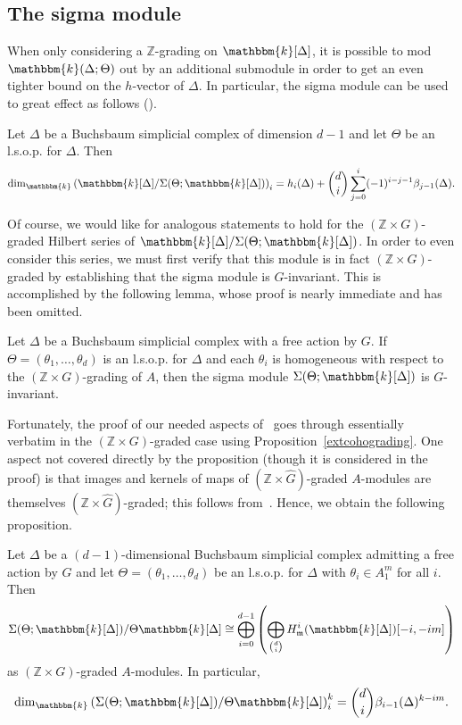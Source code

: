 \documentclass[ALCO,ThmDefs,Unicode]{cedram}
\newcommand{\field}{\mathbbm{k}}
\newcommand{\ZZ}{{\mathbb Z}}
\newcommand{\mideal}{\ensuremath{\mathfrak{m}}}
\begin{document}
\subsection{The sigma module}

When only considering a $\ZZ$-grading on $\field[\Delta]$, it is possible to mod $\field(\Delta; \Theta)$ out by an additional submodule in order to get an even tighter bound on the $h$-vector of $\Delta$. In particular, the sigma module can be used to great effect as follows (\cite[Theorem~1.2]{BBMD}).

\begin{theo}\label{BBMD}
Let $\Delta$ be a Buchsbaum simplicial complex of dimension $d-1$ and let $\Theta$ be an l.s.o.p. for $\Delta$. Then
\[
\dim_\field \left(\field[\Delta]/\Sigma(\Theta; \field[\Delta])\right)_i = h_i(\Delta)+\binom{d}{i}\sum_{j=0}^i(-1)^{i-j-1}\beta_{j-1}(\Delta).
\]
\end{theo}

Of course, we would like for analogous statements to hold for the $(\ZZ\times G)$-graded Hilbert series of $\field[\Delta]/\Sigma(\Theta; \field[\Delta])$. In order to even consider this series, we must first verify that this module is in fact $(\ZZ\times G)$-graded by establishing that the sigma module is $G$-invariant. This is accomplished by the following lemma, whose proof is nearly immediate and has been omitted.

\begin{lemma}
Let $\Delta$ be a Buchsbaum simplicial complex with a free action by $G$. If $\Theta=(\theta_1, \ldots, \theta_d)$ is an l.s.o.p. for $\Delta$ and each $\theta_i$ is homogeneous with respect to the $(\ZZ\times G)$-grading of $A$, then the sigma module $\Sigma (\Theta; \field[\Delta])$ is $G$-invariant.
\end{lemma}

Fortunately, the proof of our needed aspects of~\cite[Theorem~2.3]{BBMD} goes through essentially verbatim in the $(\ZZ\times G)$-graded case using Proposition~\ref{extcohograding}. One aspect not covered directly by the proposition (though it is considered in the proof) is that images and kernels of maps of $(\ZZ\times\hat{G})$-graded $A$-modules are themselves $(\ZZ\times\hat{G})$-graded; this follows from~\cite[Proposition~II.11.3.3]{Bourbaki}. Hence, we obtain the following proposition.

\begin{prop}\label{sigmaModuleProp}
Let $\Delta$ be a $(d-1)$-dimensional Buchsbaum simplicial complex admitting a free action by $G$ and let $\Theta=(\theta_1, \ldots, \theta_d)$ be an l.s.o.p. for $\Delta$ with $\theta_i\in A_1^m$ for all $i$. Then
\[
\Sigma(\Theta;\field[\Delta])/\Theta\field[\Delta]\cong\bigoplus_{i=0}^{d-1}\left(\bigoplus_{\binom{d}{i}}H_\mideal^{i}(\field[\Delta])[-i, -im]\right)
\]
as $(\ZZ\times G)$-graded $A$-modules. In particular,
\[
\dim_{\field}\left(\Sigma(\Theta; \field[\Delta])/\Theta\field[\Delta]\right)_i^k=\binom{d}{i}\beta_{i-1}(\Delta)^{k-im}.
\]
\end{prop}
\end{document}
